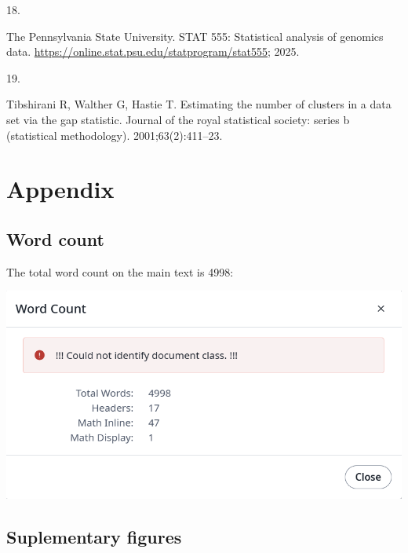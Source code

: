 \documentclass[
  a4paper,
]{scrreprt}
\newlength{\cslhangindent}
\newlength{\csllabelwidth}
\newenvironment{CSLReferences}[2] %
 {\begin{list}{}{%
  \setlength{\itemindent}{0pt}
  \setlength{\leftmargin}{0pt}
  \setlength{\parsep}{0pt}
  \ifodd #1
   \setlength{\leftmargin}{\cslhangindent}
   \setlength{\itemindent}{-1\cslhangindent}
  \fi
  \setlength{\itemsep}{#2\baselineskip}}}
 {\end{list}}
\newcommand{\CSLLeftMargin}[1]{\parbox[t]{\csllabelwidth}{\strut#1\strut}}
\newcommand{\CSLRightInline}[1]{\parbox[t]{\linewidth - \csllabelwidth}{\strut#1\strut}}
\begin{document}
\begin{CSLReferences}{0}{1}
\CSLLeftMargin{18. }%
\CSLRightInline{The Pennsylvania State University. STAT 555: Statistical
analysis of genomics data.
\url{https://online.stat.psu.edu/statprogram/stat555}; 2025. }

\CSLLeftMargin{19. }%
\CSLRightInline{Tibshirani R, Walther G, Hastie T. Estimating the number
of clusters in a data set via the gap statistic. Journal of the royal
statistical society: series b (statistical methodology).
2001;63(2):411--23. }

\end{CSLReferences}


\chapter*{Appendix}\label{appendix}


\section*{Word count}\label{word-count}


The total word count on the main text is 4998:

\includegraphics[width=0.4\linewidth,height=\textheight,keepaspectratio]{figures/wordcount.png}

\section*{Suplementary figures}\label{suplementary-figures}

\end{document}
